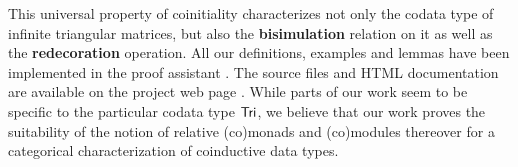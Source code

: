 \documentclass{llncs}
\newcommand{\fat}[1]{\textbf{#1}}
\begin{document}
% 
% 
This universal property of coinitiality characterizes not only the codata type of infinite triangular matrices, but also
the \fat{bisimulation} relation on it as well as the \fat{redecoration} operation.
 All our definitions, examples and lemmas have been implemented in the proof assistant \coq. %
 The \coq source files and HTML documentation are available on the project web page \parencite{trimat_coq}.
 While parts of our work seem to be specific to the particular codata type $\mathsf{Tri}$,
 we believe that our work proves the suitability of the notion of relative (co)monads and (co)modules thereover for 
 a categorical characterization of coinductive data types.


 


\renewcommand*{\bibfont}{\small}
\printbibliography[heading=none]
\end{document}

